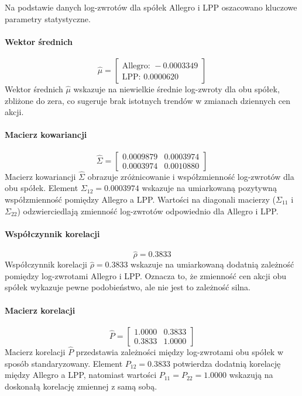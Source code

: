 \documentclass[12pt]{article}
\begin{document}
Na podstawie danych log-zwrotów dla spółek Allegro i LPP oszacowano kluczowe parametry statystyczne.

\paragraph{Wektor średnich}
\[
\hat{\mu} = \begin{bmatrix}
\text{Allegro: } -0.0003349 \\
\text{LPP: } 0.0000620
\end{bmatrix}
\]
 Wektor średnich \( \hat{\mu} \) wskazuje na niewielkie średnie log-zwroty dla obu spółek, zbliżone do zera, co sugeruje brak istotnych trendów w zmianach dziennych cen akcji.

\paragraph{Macierz kowariancji}
\[
\hat{\Sigma} = \begin{bmatrix}
0.0009879 & 0.0003974 \\
0.0003974 & 0.0010880
\end{bmatrix}
\]
Macierz kowariancji \( \hat{\Sigma} \) obrazuje zróżnicowanie i współzmienność log-zwrotów dla obu spółek. Element \( \Sigma_{12} = 0.0003974 \) wskazuje na umiarkowaną pozytywną współzmienność pomiędzy Allegro a LPP. Wartości na diagonali macierzy (\( \Sigma_{11} \) i \( \Sigma_{22} \)) odzwierciedlają zmienność log-zwrotów odpowiednio dla Allegro i LPP.


\paragraph{Współczynnik korelacji}
\[
\hat{\rho} = 0.3833
\]
Współczynnik korelacji \( \hat{\rho} = 0.3833 \) wskazuje na umiarkowaną dodatnią zależność pomiędzy log-zwrotami Allegro i LPP. Oznacza to, że zmienność cen akcji obu spółek wykazuje pewne podobieństwo, ale nie jest to zależność silna.

\paragraph{Macierz korelacji}
\[
\hat{P} = \begin{bmatrix}
1.0000 & 0.3833 \\
0.3833 & 1.0000
\end{bmatrix}
\]
Macierz korelacji \( \hat{P} \) przedstawia zależności między log-zwrotami obu spółek w sposób standaryzowany. Element \( P_{12} = 0.3833 \) potwierdza dodatnią korelację między Allegro a LPP, natomiast wartości \( P_{11} = P_{22} = 1.0000 \) wskazują na doskonałą korelację zmiennej z samą sobą.
\end{document}
